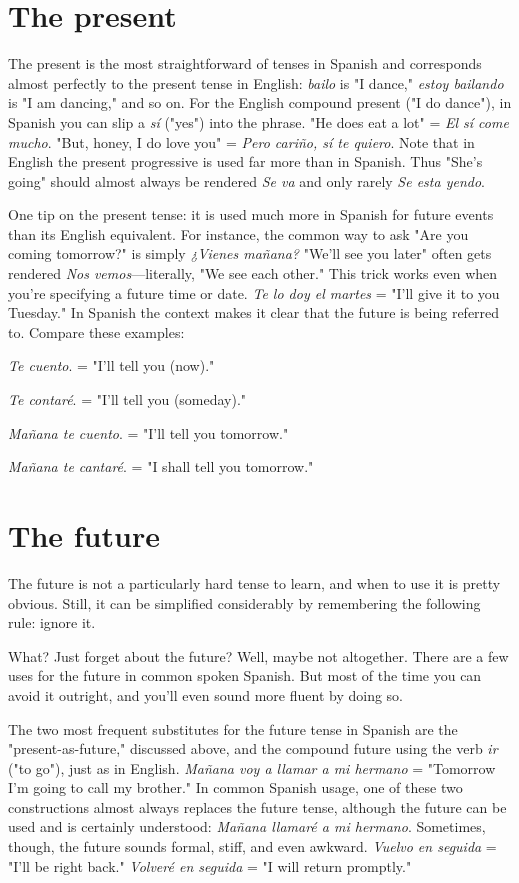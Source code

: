 \documentclass[14pt,a4paper,oneside]{memoir}
\newcommand{\bsk}{\vspace{20pt}}
\newcommand{\indu}{\hspace{20pt}}
\begin{document}
\section{The present}

The present is the most straightforward of tenses in Spanish
and corresponds almost perfectly to the present tense in English: \emph{bailo}
is "I dance," \emph{estoy bailando} is "I am dancing," and so on. For the English compound present ("I do dance"), in Spanish you can slip a \emph{sí}
("yes") into the phrase. "He does eat a lot" = \emph{El sí come mucho}. "But,
honey, I do love you" = \emph{Pero cariño, sí te quiero}. Note that in English
the present progressive is used far more than in Spanish. Thus "She's
going" should almost always be rendered \emph{Se va} and only rarely \emph{Se esta
yendo}.

One tip on the present tense: it is used much more in Spanish
for future events than its English equivalent. For instance, the common way to ask "Are you coming tomorrow?" is simply \emph{¿Vienes mañana?} "We'll see you later" often gets rendered \emph{Nos vemos}---literally,
"We see each other." This trick works even when you're specifying a
future time or date. \emph{Te lo doy el martes} = "I'll give it to you Tuesday."
In Spanish the context makes it clear that the future is being referred
to. Compare these examples:

\bsk

\indu \emph{Te cuento}. = "I'll tell you (now)."

\indu \emph{Te contaré}. = "I'll tell you (someday)."

\indu \emph{Mañana te cuento}. = "I'll tell you tomorrow."

\indu \emph{Mañana te cantaré}. = "I shall tell you tomorrow."

\section{The future}

The future is not a particularly hard tense to learn, and when
to use it is pretty obvious. Still, it can be simplified considerably by
remembering the following rule: ignore it.

What? Just forget about the future? Well, maybe not altogether. There are a few uses for the future in common spoken Spanish.
But most of the time you can avoid it outright, and you'll even sound
more fluent by doing so.

The two most frequent substitutes for the future tense in
Spanish are the "present-as-future," discussed above, and the compound future using the verb \emph{ir} ("to go"), just as in English. \emph{Mañana voy
a llamar a mi hermano} = "Tomorrow I'm going to call my brother."
In common Spanish usage, one of these two constructions almost always replaces the future tense, although the future can be used and is
certainly understood: \emph{Mañana llamaré a mi hermano}. Sometimes,
though, the future sounds formal, stiff, and even awkward. \emph{Vuelvo en
seguida} = "I'll be right back." \emph{Volveré en seguida} = "I will return
promptly."
\end{document}
